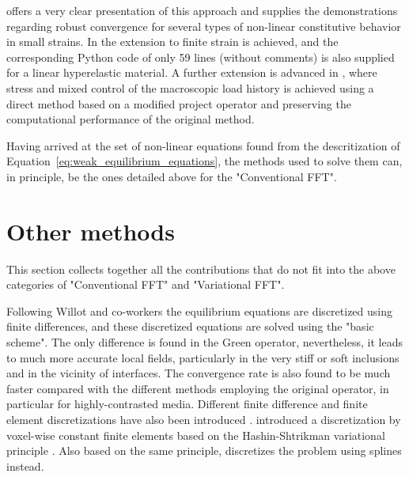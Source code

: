 \cite{zeman_finite_2017} offers a very clear presentation of this approach and supplies the demonstrations regarding robust convergence for several types of non-linear constitutive behavior in small strains.
In \cite{de_geus_finite_2017} the extension to finite strain is achieved, and the corresponding Python code of only 59 lines (without comments) is also supplied for a linear hyperelastic material.
A further extension is advanced in \cite{lucarini_algorithm_2019}, where stress and mixed control of the macroscopic load history is achieved using a direct method based on a modified project operator and preserving the computational performance of the original method.

Having arrived at the set of non-linear equations found from the descritization of Equation~\eqref{eq:weak_equilibrium_equations}, the methods used to solve them can, in principle, be the ones detailed above for the "Conventional FFT".

\section{Other methods}

This section collects together all the contributions that do not fit into the above categories of "Conventional FFT" and "Variational FFT".


Following Willot and co-workers \citep{willot_fast_2008, willot_fourier-based_2014, willot_fourier-based_2015} the equilibrium equations are discretized using finite differences, and these discretized equations are solved using the "basic scheme".
The only difference is found in the Green operator, nevertheless, it leads to much more accurate local fields, particularly in the very stiff or soft inclusions and in the vicinity of interfaces.
The convergence rate is also found to be much faster compared with the different methods employing the original operator, in particular for highly-contrasted media.
Different finite difference and finite element discretizations have also been introduced \citep{schneider_computational_2016, schneider_fft-based_2017, djaka_field_2017, eloh_development_2019}.
\cite{brisard_fft-based_2010, brisard_combining_2012} introduced a discretization by voxel-wise constant finite elements based on the Hashin-Shtrikman variational principle \citep{hashin_variational_1962}.
Also based on the same principle, \cite{tu_implementation_2020} discretizes the problem using splines instead.

